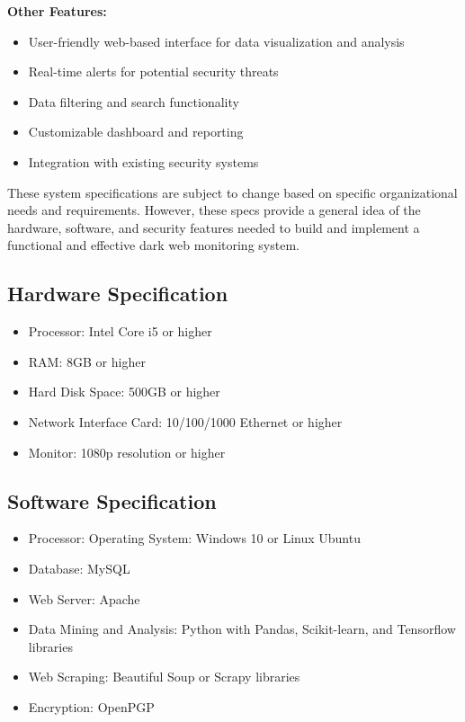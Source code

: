 \documentclass[10pt]{report}
\begin{document}
\textbf{Other Features:}
\begin{itemize}
    \item User-friendly web-based interface for data visualization and analysis
    \item Real-time alerts for potential security threats
    \item Data filtering and search functionality
    \item Customizable dashboard and reporting
    \item Integration with existing security systems
\end{itemize}

These system specifications are subject to change based on specific organizational needs and requirements. However, these specs provide a general idea of the hardware, software, and security features needed to build and implement a functional and effective dark web monitoring system.





\subsection{Hardware Specification}
\begin{itemize}
    \item Processor: Intel Core i5 or higher
    \item RAM: 8GB or higher
    \item Hard Disk Space: 500GB or higher
    \item Network Interface Card: 10/100/1000 Ethernet or higher
    \item Monitor: 1080p resolution or higher
\end{itemize}
\subsection{Software Specification}
\begin{itemize}
    \item Processor: Operating System: Windows 10 or Linux Ubuntu
    \item Database: MySQL
    \item Web Server: Apache
    \item Data Mining and Analysis: Python with Pandas, Scikit-learn, and Tensorflow libraries
    \item Web Scraping: Beautiful Soup or Scrapy libraries
    \item Encryption: OpenPGP 
\end{itemize}
\end{document}
